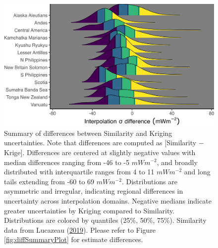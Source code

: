 \begin{figure}[htbp]

{\centering \includegraphics[width=1\linewidth,]{assets/figs/chpt3/interpSigmaDiffSummary} 

}

\caption[Summary of differences between Similarity and Kriging uncertainties]{Summary of differences between Similarity and Kriging uncertainties. Note that differences are computed as {[}Similarity \(-\) Krige{]}. Differences are centered at slightly negative values with median differences ranging from -46 to -5 \(mWm^{-2}\), and broadly distributed with interquartile ranges from 4 to 11 \(mWm^{-2}\) and long tails extending from -60 to 69 \(mWm^{-2}\). Distributions are asymmetric and irregular, indicating regional differences in uncertainty across interpolation domains. Negative medians indicate greater uncertainties by Kriging compared to Similarity. Distributions are colored by quantiles (25\%, 50\%, 75\%). Similarity data from Lucazeau (\protect\hyperlink{ref-lucazeau2019}{2019}). Please refer to Figure \ref{fig:diffSummaryPlot} for estimate differences.}\label{fig:sigmaDiffSummaryPlot}
\end{figure}

